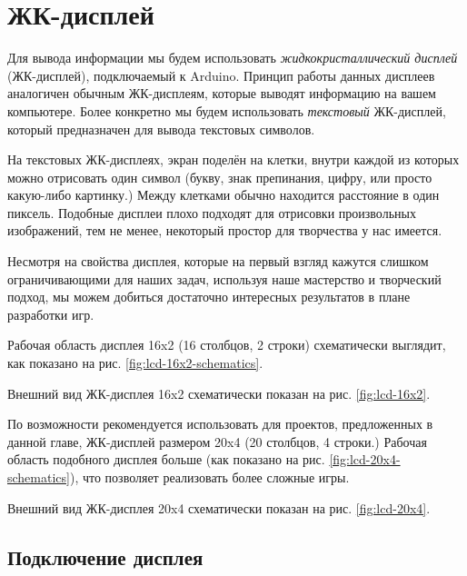 \documentclass[../sparc.tex]{subfiles}
\begin{document}
\section{ЖК-дисплей}

Для вывода информации мы будем использовать \emph{жидкокристаллический дисплей}
(ЖК-дисплей), подключаемый к Arduino.  Принцип работы данных дисплеев аналогичен
обычным ЖК-дисплеям, которые выводят информацию на вашем компьютере.  Более
конкретно мы будем использовать \emph{текстовый} ЖК-дисплей, который
предназначен для вывода текстовых символов.

На текстовых ЖК-дисплеях, экран поделён на клетки, внутри каждой из которых
можно отрисовать один символ (букву, знак препинания, цифру, или просто
какую-либо картинку.)  Между клетками обычно находится расстояние в один
пиксель.  Подобные дисплеи плохо подходят для отрисовки произвольных
изображений, тем не менее, некоторый простор для творчества у нас имеется.

Несмотря на свойства дисплея, которые на первый взгляд кажутся слишком
ограничивающими для наших задач, используя наше мастерство и творческий подход,
мы можем добиться достаточно интересных результатов в плане разработки игр.

Рабочая область дисплея 16x2 (16 столбцов, 2 строки) схематически выглядит, как
показано на рис. \ref{fig:lcd-16x2-schematics}.


Внешний вид ЖК-дисплея 16x2 схематически показан на рис. \ref{fig:lcd-16x2}.


По возможности рекомендуется использовать для проектов, предложенных в данной
главе, ЖК-дисплей размером 20x4 (20 столбцов, 4 строки.)  Рабочая область
подобного дисплея больше (как показано на рис. \ref{fig:lcd-20x4-schematics}),
что позволяет реализовать более сложные игры.


Внешний вид ЖК-дисплея 20x4 схематически показан на рис. \ref{fig:lcd-20x4}.


\subsection{Подключение дисплея}
\end{document}
